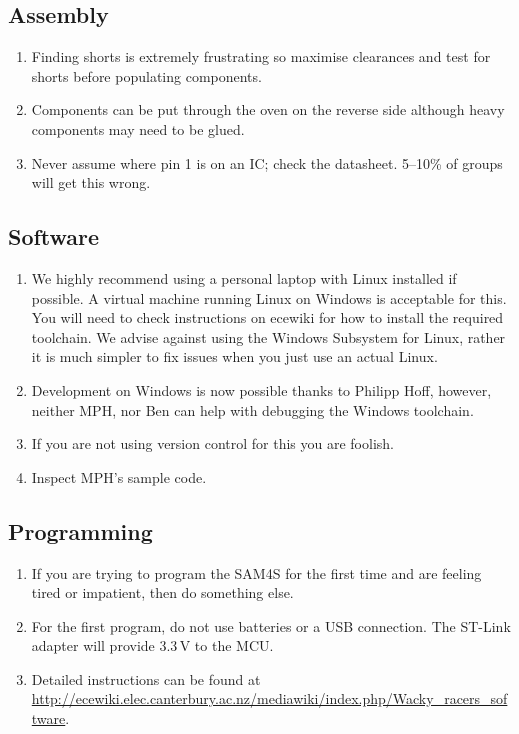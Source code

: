 \documentclass[11pt, a4paper]{article}
\begin{document}
\subsection{Assembly}

\begin{enumerate}
\item Finding shorts is extremely frustrating so maximise clearances
  and test for shorts before populating components.

\item Components can be put through the oven on the reverse side
  although heavy components may need to be glued.

\item Never assume where pin 1 is on an IC; check the datasheet.
  5--10\% of groups will get this wrong.

\end{enumerate}


\subsection{Software}

\begin{enumerate}
\item We highly recommend using a personal laptop with Linux installed if
  possible. A virtual machine running Linux on Windows is acceptable for this.
  You will need to check instructions on ecewiki for how to install the required
  toolchain. We advise against using the Windows Subsystem for Linux, rather it
  is much simpler to fix issues when you just use an actual Linux.

\item Development on Windows is now possible thanks to Philipp Hoff, however,
  neither MPH, nor Ben can help with debugging the Windows toolchain.

\item If you are not using version control for this you are foolish.

\item Inspect MPH's sample code.

\end{enumerate}


\subsection{Programming}

\begin{enumerate}
\item If you are trying to program the SAM4S for the first time and
  are feeling tired or impatient, then do something else.

\item For the first program, do not use batteries or a USB connection.
  The ST-Link adapter will provide 3.3\,V to the MCU.

\item Detailed instructions can be found at
  \url{http://ecewiki.elec.canterbury.ac.nz/mediawiki/index.php/Wacky_racers_software}.
\end{enumerate}
\end{document}
